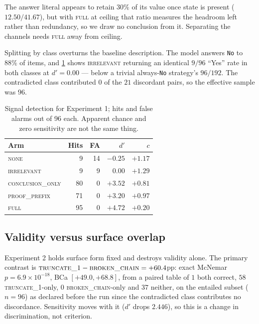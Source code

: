 \documentclass[10pt,twocolumn]{article}
\begin{document}
The answer literal appears to retain $30\%$ of its value once state is present
($12.50/41.67$), but with \textsc{full} at ceiling that ratio measures the
headroom left rather than redundancy, so we draw no conclusion from it.
Separating the channels needs \textsc{full} away from ceiling.

Splitting by class overturns the baseline description. The model answers
\texttt{No} to $88\%$ of items, and \cref{tab:sdt} shows \textsc{irrelevant}
returning an identical $9/96$ ``Yes'' rate in both classes at $d' = 0.00$ --- below
a trivial always-\texttt{No} strategy's $96/192$. The contradicted class
contributed $0$ of the $21$ discordant pairs, so the effective sample was $96$.

\begin{table}[tb]
\centering\footnotesize
\caption{Signal detection for Experiment 1; hits and false alarms out of 96
each. Apparent chance and zero
sensitivity are not the same thing.}
\label{tab:sdt}
\begin{tabular}{lrrrr}
\toprule
Arm & Hits & FA & $d'$ & $c$ \\
\midrule
\textsc{none} & 9 & 14 & $-0.25$ & $+1.17$ \\
\textsc{irrelevant}      &  9 &  9 & $\mathbf{0.00}$ & $+1.29$ \\
\textsc{conclusion\_only}& 80 &  0 & $+3.52$ & $+0.81$ \\
\textsc{proof\_prefix}   & 71 &  0 & $+3.20$ & $+0.97$ \\
\textsc{full}            & 95 &  0 & $+4.72$ & $+0.20$ \\
\bottomrule
\end{tabular}
\end{table}

\subsection{Validity versus surface overlap}

Experiment 2 holds surface form fixed and destroys validity alone. The primary
contrast is $\textsc{truncate\_1} - \textsc{broken\_chain} = +60.4$pp: exact
McNemar $p = 6.9\times10^{-18}$, BCa $[+49.0, +68.8]$, from a paired table of $1$
both correct, $58$ \textsc{truncate\_1}-only, $0$ \textsc{broken\_chain}-only and
$37$ neither, on the entailed subset ($n = 96$) as declared before the run since
the contradicted class contributes no discordance. Sensitivity moves with it
($d'$ drops $2.446$), so this is a change in discrimination, not criterion.
\end{document}
